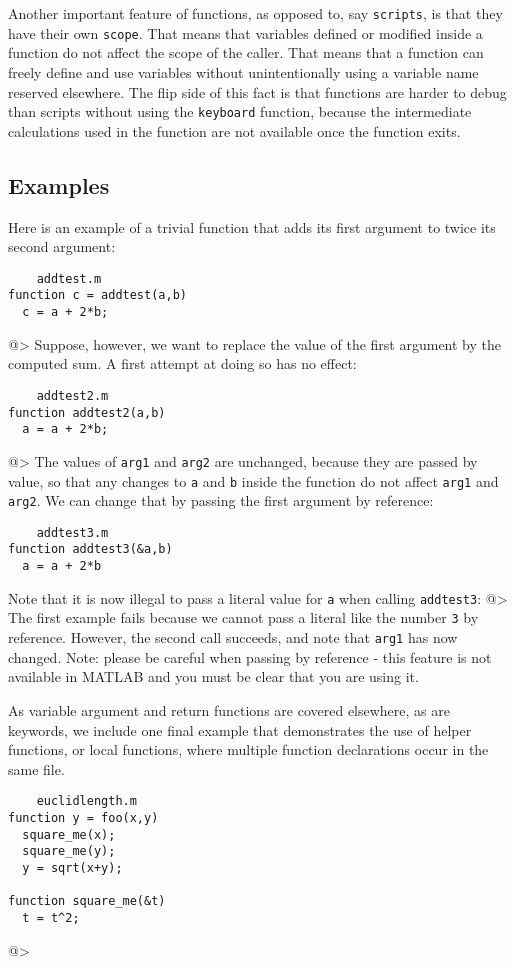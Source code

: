 Another important feature of functions, as opposed to, say \verb|scripts|,
is that they have their own \verb|scope|.  That means that variables
defined or modified inside a function do not affect the scope of the
caller.  That means that a function can freely define and use variables
without unintentionally using a variable name reserved elsewhere.  The
flip side of this fact is that functions are harder to debug than
scripts without using the \verb|keyboard| function, because the intermediate
calculations used in the function are not available once the function
exits.
\subsection{Examples}

Here is an example of a trivial function that adds its
first argument to twice its second argument:
\begin{verbatim}
    addtest.m
function c = addtest(a,b)
  c = a + 2*b;
\end{verbatim}
@>
Suppose, however, we want to replace the value of the first 
argument by the computed sum.  A first attempt at doing so
has no effect:
\begin{verbatim}
    addtest2.m
function addtest2(a,b)
  a = a + 2*b;
\end{verbatim}
@>
The values of \verb|arg1| and \verb|arg2| are unchanged, because they are
passed by value, so that any changes to \verb|a| and \verb|b| inside 
the function do not affect \verb|arg1| and \verb|arg2|.  We can change
that by passing the first argument by reference:
\begin{verbatim}
    addtest3.m
function addtest3(&a,b)
  a = a + 2*b
\end{verbatim}
Note that it is now illegal to pass a literal value for \verb|a| when
calling \verb|addtest3|:
@>
The first example fails because we cannot pass a literal like the
number \verb|3| by reference.  However, the second call succeeds, and
note that \verb|arg1| has now changed.  Note: please be careful when
passing by reference - this feature is not available in MATLAB
and you must be clear that you are using it.

As variable argument and return functions are covered elsewhere,
as are keywords, we include one final example that demonstrates
the use of helper functions, or local functions, where
multiple function declarations occur in the same file.
\begin{verbatim}
    euclidlength.m
function y = foo(x,y)
  square_me(x);
  square_me(y);
  y = sqrt(x+y);

function square_me(&t)
  t = t^2;
\end{verbatim}
@>
